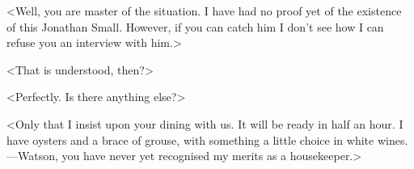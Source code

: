 <Well, you are master of the situation. I have had no proof yet of the existence of this Jonathan Small. However, if you can catch him I don't see how I can refuse you an interview with him.>

<That is understood, then?>

<Perfectly. Is there anything else?>

<Only that I insist upon your dining with us. It will be ready in half an hour. I have oysters and a brace of grouse, with something a little choice in white wines.—Watson, you have never yet recognised my merits as a housekeeper.>

